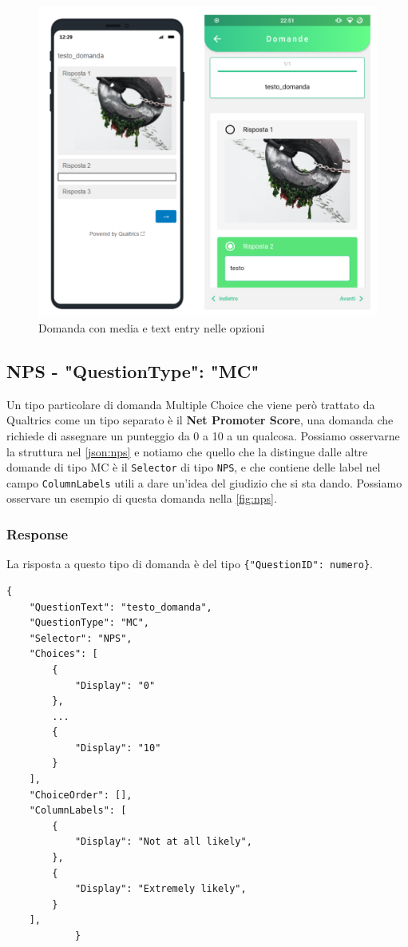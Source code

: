 \begin{figure}[ht!]
\centering
\includegraphics[width=\textwidth]{img/mc_media}
\caption{Domanda con media e text entry nelle opzioni}
\label{fig:mc_media}
\end{figure}

\clearpage
\subsection{NPS - "QuestionType": "MC"}
Un tipo particolare di domanda Multiple Choice che viene però trattato da Qualtrics come un tipo separato è il \textbf{Net Promoter Score}, una domanda che richiede di assegnare un punteggio da 0 a 10 a un qualcosa. Possiamo osservarne la struttura nel \autoref{json:nps} e notiamo che quello che la distingue dalle altre domande di tipo MC è il \texttt{Selector} di tipo \texttt{NPS}, e che contiene delle label nel campo \texttt{ColumnLabels} utili a dare un'idea del giudizio che si sta dando. Possiamo osservare un esempio di questa domanda nella \autoref{fig:nps}.

\subsubsection{Response}
La risposta a questo tipo di domanda è del tipo \texttt{\{"QuestionID": numero\}}.

\begin{json}
\begin{verbatim}
{
    "QuestionText": "testo_domanda",
    "QuestionType": "MC",
    "Selector": "NPS",
    "Choices": [
        {
            "Display": "0"
        },
        ...
        {
            "Display": "10"
        }
    ],
    "ChoiceOrder": [],
    "ColumnLabels": [
        {
            "Display": "Not at all likely",
        },
        {
            "Display": "Extremely likely",
        }
    ],
            }
\end{verbatim}
\caption{Oggetto domanda NPS}
\label{json:nps}
\end{json}

